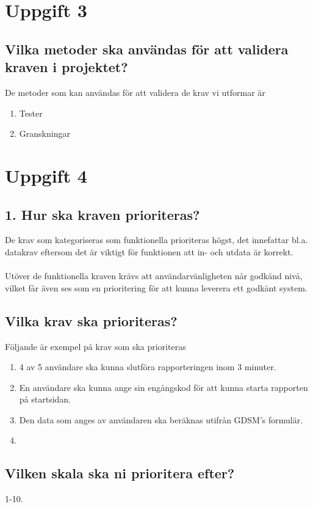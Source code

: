 \documentclass{article}
\begin{document}
\section*{Uppgift 3}
\subsection*{Vilka metoder ska användas för att validera kraven i projektet?}

De metoder som kan användas för att validera de krav vi utformar är
\begin{enumerate}
    \item Tester
    \item Granskningar
\end{enumerate}

\section*{Uppgift 4}
\subsection*{1. Hur ska kraven prioriteras?}
De krav som kategoriseras som funktionella prioriteras högst, det innefattar bl.a. datakrav eftersom det är viktigt för funktionen att in- och utdata är korrekt.\\\\
Utöver de funktionella kraven krävs att användarvänligheten når godkänd nivå, vilket får även ses som en prioritering för att kunna leverera ett godkänt system.

\subsection*{Vilka krav ska prioriteras?}
Följande är exempel på krav som ska prioriteras
\begin{enumerate}
    \item 4 av 5 användare ska kunna slutföra rapporteringen inom 3 minuter.
    \item En användare ska kunna ange sin engångskod för att kunna starta rapporten på startsidan.
    \item Den data som anges av användaren ska beräknas utifrån GDSM's formulär.
    \item 
\end{enumerate}
\subsection*{Vilken skala ska ni prioritera efter?}
1-10.
\end{document}
